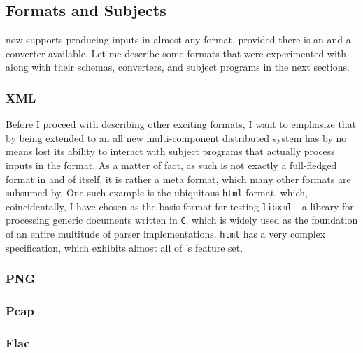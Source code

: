 \subsection{Formats and Subjects}
\xmlmate now supports producing inputs in almost any format, provided there is an \xsd and a converter
available. Let me describe some formats that were experimented with along with their schemas, converters, and
subject programs in the next sections.
\subsubsection{XML}
Before I proceed with describing other exciting formats, I want to emphasize that by being extended to an all
new multi-component distributed system \xmlmate has by no means lost its ability to interact with subject
programs that actually process inputs in the \xml format. As a matter of fact, \xml as such is not exactly a
full-fledged format in and of itself, it is rather a meta format, which many other formats are subsumed by. One
such example is the ubiquitous \texttt{html} format, which, coincidentally, I have chosen as the basis format
for testing \texttt{libxml} - a library for processing generic \xml documents written in \texttt{C}, which is
widely used as the foundation of an entire multitude of parser implementations. 
\texttt{html} has a very complex specification, which exhibits almost all of \xml's feature set.
\subsubsection{PNG}
 
\subsubsection{Pcap}
 
\subsubsection{Flac}
 